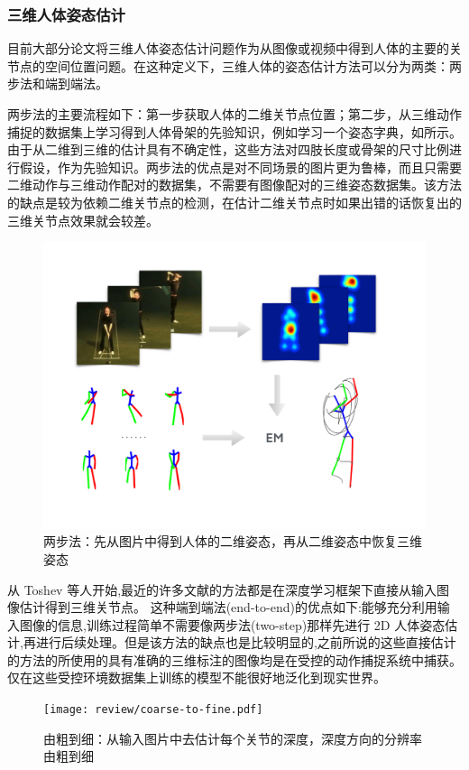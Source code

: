 \subsubsection{三维人体姿态估计}
目前大部分论文将三维人体姿态估计问题作为从图像或视频中得到人体的主要的关节点的空间位置问题。在这种定义下，三维人体的姿态估计方法可以分为两类：两步法和端到端法。

两步法的主要流程如下：第一步获取人体的二维关节点位置；第二步，从三维动作捕捉的数据集上学习得到人体骨架的先验知识，例如学习一个姿态字典\autocite{zhou2015sparse}，如所示。由于从二维到三维的估计具有不确定性，这些方法对四肢长度或骨架的尺寸比例进行假设，作为先验知识。两步法的优点是对不同场景的图片更为鲁棒，而且只需要二维动作与三维动作配对的数据集，不需要有图像配对的三维姿态数据集。该方法的缺点是较为依赖二维关节点的检测，在估计二维关节点时如果出错的话恢复出的三维关节点效果就会较差。

\begin{figure}[ht]
    \centering
    \includegraphics[width=0.4\linewidth]{figures/overview.pdf}
    \caption{两步法\autocite{zhou2015sparse}：先从图片中得到人体的二维姿态，再从二维姿态中恢复三维姿态}\label{fig:twostep}
\end{figure}

从 Toshev \autocite{toshev2014deep}等人开始,最近的许多文献的方法都是在深度学习框架下直接从输入图像估计得到三维关节点\autocite{pavlakos2017coarse,zhou2017weaklysupervised}。%
这种端到端法(end-to-end)的优点如下:能够充分利用输入图像的信息,训练过程简单不需要像两步法(two-step)那样先进行 2D 人体姿态估计,再进行后续处理。但是该方法的缺点也是比较明显的,之前所说的这些直接估计的方法的所使用的具有准确的三维标注的图像均是在受控的动作捕捉系统中捕获。仅在这些受控环境数据集上训练的模型不能很好地泛化到现实世界。

\begin{figure}[ht]
    \centering
    \texttt{[image: review/coarse-to-fine.pdf]}
    \caption{由粗到细\autocite{pavlakos2017coarse}：从输入图片中去估计每个关节的深度，深度方向的分辨率由粗到细}\label{fig:c2f}
\end{figure}

